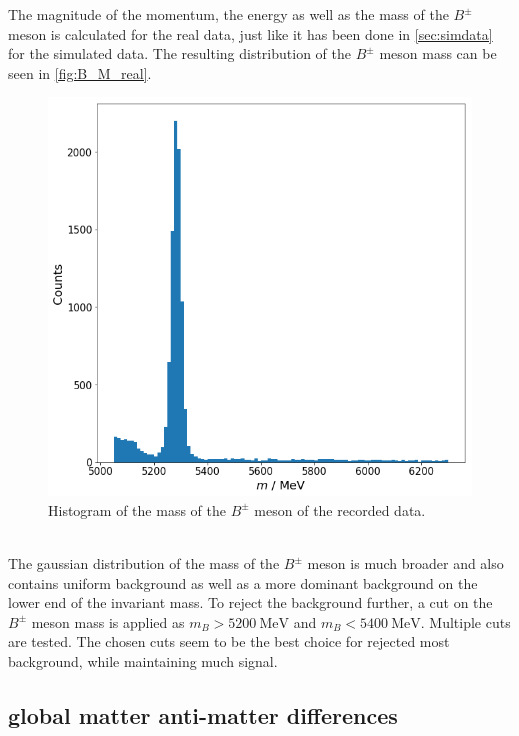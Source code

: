 The magnitude of the momentum, the energy as well as the mass of the $B^{\pm}$ meson is calculated for the real data, just like it has been done in \autoref{sec:simdata} for the simulated data.
The resulting distribution of the $B^{\pm}$ meson mass can be seen in \autoref{fig:B_M_real}.
\begin{figure}
  \centering
  \includegraphics[width = .95\textwidth]{"content/pics/B_M_real.png"}
  \caption{Histogram of the mass of the $B^{\pm}$ meson of the recorded data.}
  \label{fig:B_M_real}
\end{figure}
\\ The gaussian distribution of the mass of the $B^{\pm}$ meson is much broader and also contains uniform background as well as a more dominant background on the lower end of the invariant mass.
To reject the background further, a cut on the $B^{\pm}$ meson mass is applied as $m_B > \qty{5200}{\mega\electronvolt}$ and $m_B < \qty{5400}{\mega\electronvolt}$. Multiple 
cuts are tested. The chosen cuts seem to be the best choice for rejected most background, while maintaining much signal.\\

\subsection{global matter anti-matter differences}

